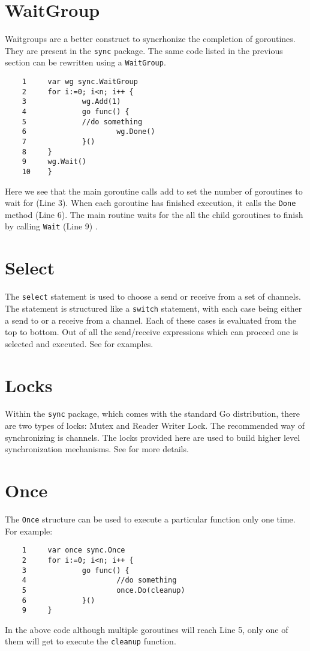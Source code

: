 \documentclass[8pt, twocolumn]{article}
\begin{document}
\section{WaitGroup}
Waitgroups are a better construct to syncrhonize the completion of
goroutines. They are present in the \verb=sync= package. The same code
listed in the previous section can be rewritten using a
\verb=WaitGroup=. 
\begin{verbatim}
    1     var wg sync.WaitGroup
    2     for i:=0; i<n; i++ {
    3             wg.Add(1)
    4             go func() {
    5             //do something
    6                     wg.Done()
    7             }()
    8     }
    9     wg.Wait()
    10    } 
\end{verbatim}
Here we see that the main goroutine calls add to set the number of
goroutines to wait for (Line 3). When each goroutine has finished execution, it
calls the \verb=Done= method (Line 6). The main routine waits for the
all the child goroutines to finish by calling \verb=Wait= (Line 9) \cite{sync}.

\section{Select}
The \verb=select= statement is used to choose a send or receive from a
set of channels. The statement is structured like a \verb=switch=
statement, with each case being either a send to or a receive from a
channel. Each of these cases is evaluated from the top to bottom. Out
of all the send/receive expressions which can proceed one is selected
and executed. See \cite{golangspec} for examples.
\section{Locks}
Within the \verb=sync= package, which comes with the standard Go
distribution, there are two types of locks: Mutex and Reader Writer
Lock. The recommended way of synchronizing is channels. The locks
provided here are used to build higher level synchronization
mechanisms. See \cite{sync} for more details.
\section{Once}
The \verb=Once= structure can be used to execute a particular function
only one time. For example:
\begin{verbatim}
    1     var once sync.Once
    2     for i:=0; i<n; i++ {
    3             go func() {
    4                     //do something
    5                     once.Do(cleanup)
    6             }()
    9     }
\end{verbatim}
In the above code although multiple goroutines will reach Line 5, only
one of them will get to execute the \verb=cleanup= function.
\end{document}
